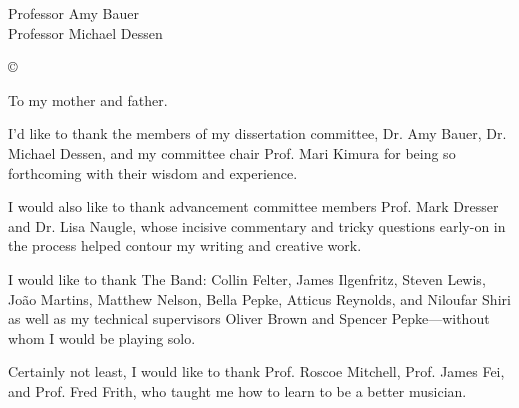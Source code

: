 




\othercommitteemembers
{
  Professor Amy Bauer\\
  Professor Michael Dessen
}


\copyrightdeclaration
{
  {\copyright} {\Degreeyear} \Authorname
}


\dedications
{
  To my mother and father.
}

\acknowledgments
{    
    I'd like to thank the members of my dissertation committee, Dr. Amy Bauer, Dr. Michael Dessen, and my committee chair Prof. Mari Kimura for being so forthcoming with their wisdom and experience.

    I would also like to thank advancement committee members Prof. Mark Dresser and Dr. Lisa Naugle, whose incisive commentary and tricky questions early-on in the process helped contour my writing and creative work.

    I would like to thank The Band: Collin Felter, James Ilgenfritz, Steven Lewis, Jo\~{a}o Martins, Matthew Nelson, Bella Pepke, Atticus Reynolds, and Niloufar Shiri as well as my technical supervisors Oliver Brown and Spencer Pepke---without whom I would be playing solo. 

    Certainly not least, I would like to thank Prof. Roscoe Mitchell, Prof. James Fei, and Prof. Fred Frith, who taught me how to learn to be a better musician.
}


